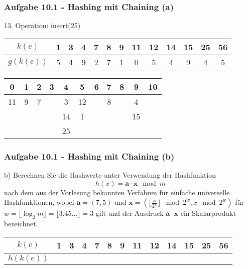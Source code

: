   \begin{frame}
    \frametitle{Aufgabe 10.1 - Hashing mit Chaining (a)}
    13. Operation: insert(25)
    \begin{center}
      \begin{tabular}{c|c|c|c|c|c|c|c|c|c|c|c|c}
        $k(e)$    & 1 & 3 & 4 & 7 & 8 & 9 & 11 & 12 & 14 & 15 & 25 & 56 \\
        \hline
        $g(k(e))$ & 5 & 4 & 9 & 2 & 7 & 1 & 0  & 5  & 4  & 9  & 4  & 5  \\
      \end{tabular}
  
      \bigskip
  
      \begin{tabular}{c|c|c|c|c|c|c|c|c|c|c}
        0  & 1 & 2 & 3 & 4  & 5  & 6 & 7 & 8 & 9  & 10 \\
        \hline
        11 & 9 & 7 &   & 3  & 12 &   & 8 &   & 4  &    \\
           &   &   &   & 14 & 1  &   &   &   & 15 &    \\
           &   &   &   & 25 &    &   &   &   &    &    \\
      \end{tabular}
    \end{center}
  \end{frame}
  
  \begin{frame}
    \frametitle{Aufgabe 10.1 - Hashing mit Chaining (b)}
    b) Berechnen Sie die Hashwerte unter Verwendung der Hashfunktion
    $$h(x) = \mathbf{a} \cdot \mathbf{x} \mod m$$
    nach dem aus der Vorlesung bekannten Verfahren für einfache universelle Hashfunktionen,
    wobei $\mathbf{a} = (7, 5)$ und $\mathbf{x} = (\lfloor \frac{x}{2^w} \rfloor \mod 2^w, x \mod 2^w)$
    für $w = \lfloor \log_2 m \rfloor = \lfloor 3.45 \dots \rfloor = 3$ gilt
    und der Ausdruck $\mathbf{a} \cdot \mathbf{x}$ ein Skalarprodukt bezeichnet.
  
    \bigskip
    \bigskip
  
    \begin{center}
      \begin{tabular}{c|c|c|c|c|c|c|c|c|c|c|c|c}
        $k(e)$    & 1 & 3 & 4 & 7 & 8 & 9 & 11 & 12 & 14 & 15 & 25 & 56 \\
        \hline
        $h(k(e))$ &   &   &   &   &   &   &    &    &    &    &    &    \\
      \end{tabular}
    \end{center}
  \end{frame}
  
